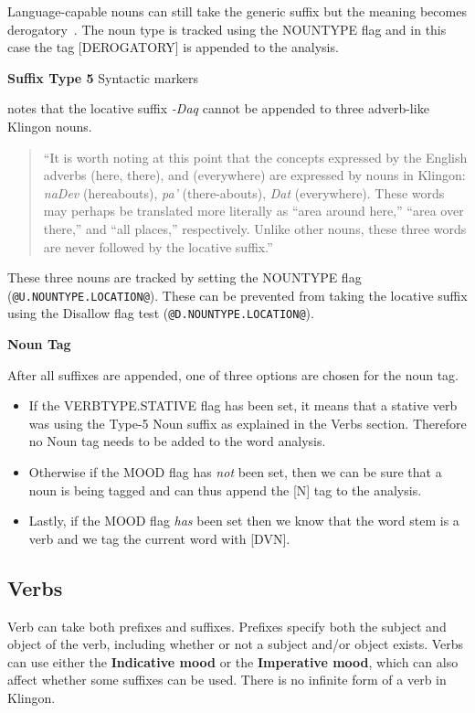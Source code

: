 \documentclass[11pt]{article}
\begin{document}
Language-capable nouns can still take the generic suffix but the meaning becomes derogatory~\cite{Okrand:92}. The noun type is tracked using the NOUNTYPE flag and in this case the tag [DEROGATORY] is appended to the analysis.

\textbf{Suffix Type 5} Syntactic markers

\cite{Okrand:92} notes that the locative suffix \textit{-Daq} cannot be appended to three adverb-like Klingon nouns.

\begin{quote}
``It is worth noting at this point that the concepts expressed by the English adverbs (here, there), and (everywhere) are expressed by nouns in Klingon: \textit{naDev} (hereabouts), \textit{pa'} (there-abouts), \textit{Dat} (everywhere). These words may perhaps be translated more literally as ``area around here,'' ``area over there,'' and ``all places,'' respectively. Unlike other nouns, these three words are never followed by the locative suffix.''
\end{quote}

These three nouns are tracked by setting the NOUNTYPE flag (\texttt{@U.NOUNTYPE.LOCATION@}). These can be prevented from taking the locative suffix using the Disallow flag test (\texttt{@D.NOUNTYPE.LOCATION@}).

\textbf{Noun Tag}

After all suffixes are appended, one of three options are chosen for the noun tag.

\begin{itemize}
	\item If the VERBTYPE.STATIVE flag has been set, it means that a stative verb was using the Type-5 Noun suffix as explained in the Verbs section. Therefore no Noun tag needs to be added to the word analysis.
	\item Otherwise if the MOOD flag has \textit{not} been set, then we can be sure that a noun is being tagged and can thus append the [N] tag to the analysis.
	\item Lastly, if the MOOD flag \textit{has} been set then we know that the word stem is a verb and we tag the current word with [DVN].
\end{itemize}

\subsection {Verbs}

Verb can take both prefixes and suffixes. Prefixes specify both the subject and object of the verb, including whether or not a subject and/or object exists. Verbs can use either the \textbf{Indicative mood} or the \textbf{Imperative mood}, which can also affect whether some suffixes can be used. There is no infinite form of a verb in Klingon.
\end{document}
